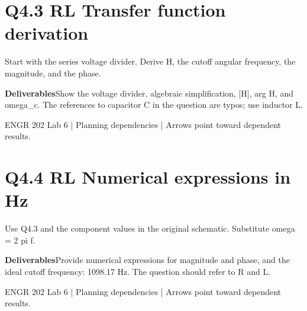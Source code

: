 \documentclass[11pt]{article}
\begin{document}
\section*{Q4.3 RL Transfer function derivation}
Start with the series voltage divider. Derive H, the cutoff angular frequency, the magnitude, and the phase.\par\medskip
\textbf{Deliverables}\quad Show the voltage divider, algebraic simplification, |H|, arg H, and omega\_c. The references to capacitor C in the question are typos; use inductor L.\par\bigskip
\begin{center}\end{center}
\vfill\small ENGR 202 Lab 6 | Planning dependencies | Arrows point toward dependent results.
\newpage
\section*{Q4.4 RL Numerical expressions in Hz}
Use Q4.3 and the component values in the original schematic. Substitute omega = 2 pi f.\par\medskip
\textbf{Deliverables}\quad Provide numerical expressions for magnitude and phase, and the ideal cutoff frequency: 1098.17 Hz. The question should refer to R and L.\par\bigskip
\begin{center}\end{center}
\vfill\small ENGR 202 Lab 6 | Planning dependencies | Arrows point toward dependent results.
\newpage
\end{document}
